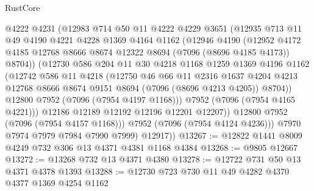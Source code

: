\begin{lexlean}{RustCore}
\begin{coremodule}
                @4222
                @4231
                (@12983
                  @714
                  @50
                  @11
                  @4222
                  @4229
                  @3651
                  (@12935
                    @713
                    @11
                    @49
                    @4190
                    @4221
                    @4228
                    @1369
                    @4164
                    @1162
                    (@12946
                      @4190
                      (@12952
                        @4172
                        @4185
                        @12768
                        @8666
                        @8674
                        @12322
                        @8694
                        (@7096 (@8696 @4185 @4173))
                        @8704))
                    (@12730
                      @586
                      @204
                      @11
                      @30
                      @4218
                      @1168
                      @1259
                      @1369
                      @4196
                      @1162
                      (@12742
                        @586
                        @11
                        @4218
                        (@12750
                          @46
                          @66
                          @11
                          @2316
                          @1637
                          @4204
                          @4213
                          @12768
                          @8666
                          @8674
                          @9151
                          @8694
                          (@7096 (@8696 @4213 @4205))
                          @8704))
                      @12800
                      @7952
                      (@7096 (@7954 @4197 @1168)))
                    @7952
                    (@7096 (@7954 @4165 @4221)))
                  @12186
                  @12189
                  @12192
                  @12196
                  @12201
                  @12207))
              @12800
              @7952
              (@7096 (@7954 @4157 @1168)))
            @7952
            (@7096 (@7954 @4124 @4236)))
          @7970
          @7974
          @7979
          @7984
          @7990
          @7999)
        @12917))
@13267 := @12822 @1441 @8009 @4249 @732 @306 @13 @4371 @4381 @1168 @4384
@13268 := @9805 @12667
@13272 := @13268 @732 @13 @4371 @4380
@13278 := @12722 @731 @50 @13 @4371 @4378 @1393
@13288 := @12730 @723 @730 @11 @49 @4282 @4370 @4377 @1369 @4254 @1162

\end{coremodule}
\end{lexlean}
